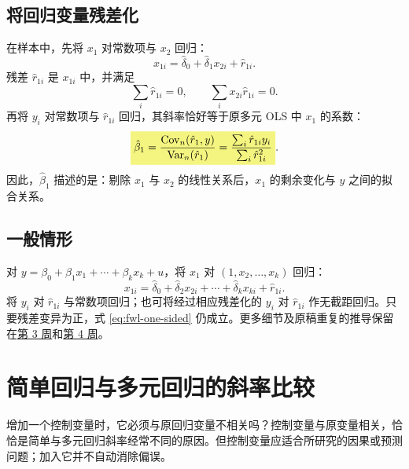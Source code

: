 \subsection{将回归变量残差化}
在样本中，先将 $x_1$ 对常数项与 $x_2$ 回归：
\begin{equation}\label{eq:fwl-x}
x_{1i}=\hat\delta_0+\hat\delta_1x_{2i}+\hat r_{1i}.
\end{equation}
残差 $\hat r_{1i}$ 是 $x_{1i}$ 中，并满足
\[\sum_i\hat r_{1i}=0,\qquad\sum_i x_{2i}\hat r_{1i}=0.\]
再将 $y_i$ 对常数项与 $\hat r_{1i}$ 回归，其斜率恰好等于原多元 OLS 中 $x_1$ 的系数：
\begin{equation}\label{eq:fwl-one-sided}
\hm{\hat\beta_1=
\frac{\Cov_n(\hat r_1,y)}{\Var_n(\hat r_1)}
=\frac{\sum_i\hat r_{1i}y_i}{\sum_i\hat r_{1i}^2}}.
\end{equation}
因此，$\hat\beta_1$ 描述的是：剔除 $x_1$ 与 $x_2$ 的线性关系后，$x_1$ 的剩余变化与 $y$ 之间的拟合关系。


\subsection{一般情形}
对 $y=\beta_0+\beta_1x_1+\cdots+\beta_kx_k+u$，将 $x_1$ 对 $(1,x_2,\ldots,x_k)$ 回归：
\[x_{1i}=\hat\delta_0+\hat\delta_2x_{2i}+\cdots+\hat\delta_kx_{ki}+\hat r_{1i}.\]
将 $y_i$ 对 $\hat r_{1i}$ 与常数项回归；也可将经过相应残差化的 $y_i$ 对 $\hat r_{1i}$ 作无截距回归。只要残差变异为正，式 \eqref{eq:fwl-one-sided} 仍成立。更多细节及原稿重复的推导保留在\hyperref[sec:fwl-week3]{第 3 周}和\hyperref[sec:fwl-week4]{第 4 周}。

\section{简单回归与多元回归的斜率比较}
\label{sec:short-long-week2}
增加一个控制变量时，它必须与原回归变量不相关吗？控制变量与原变量相关，恰恰是简单与多元回归斜率经常不同的原因。但控制变量应适合所研究的因果或预测问题；加入它并不自动消除偏误。

